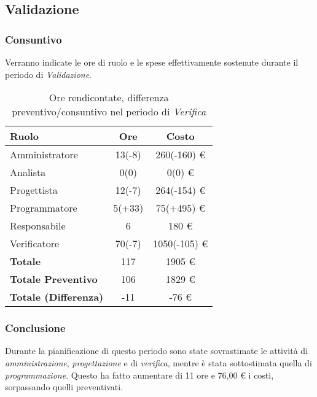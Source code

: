 \subsection{Validazione}
\subsubsection{Consuntivo}
Verranno indicate le ore di ruolo e le spese effettivamente sostenute durante il periodo di \textit{Validazione}.

\begin{table}[H]
	\centering
	\begin{tabular}{ l c c }
		\textbf{Ruolo} & \textbf{Ore} & \textbf{Costo} \\
		\hline
		Amministratore & 13(-8) & 260(-160) \euro{} \\
		Analista & 0(0) & 0(0) \euro{} \\
		Progettista & 12(-7) & 264(-154) \euro{} \\ 
		Programmatore & 5(+33) & 75(+495) \euro{} \\ 
		Responsabile & 6 & 180 \euro{} \\
		Verificatore & 70(-7) & 1050(-105) \euro{} \\
		\hline
		\textbf{Totale \glossaryItem{Consuntivo}} & 117 & 1905 \euro{} \\
		\hline
		\textbf{Totale Preventivo} & 106 & 1829 \euro{} \\
		\hline
		\textbf{Totale (Differenza)} & -11 & -76 \euro{} \\
		\hline
	\end{tabular}
	\caption{Ore rendicontate, differenza preventivo/consuntivo nel periodo di \textit{Verifica}}
\end{table}



\subsubsection{Conclusione}
Durante la pianificazione di questo periodo sono state sovrastimate le attivit\`a di \textit{amministrazione}, \textit{progettazione} e di \textit{verifica}, mentre \`e stata sottostimata quella di \textit{programmazione}.
Questo ha fatto aumentare di 11 ore e 76,00 \euro{} i costi, sorpassando quelli preventivati.
